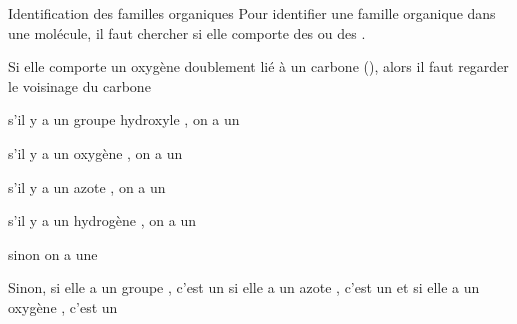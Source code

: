 \begin{doc}{Identification des familles organiques}
  Pour identifier une famille organique dans une molécule, il faut chercher si elle comporte des  ou des . 
  
  Si elle comporte un oxygène  doublement lié à un carbone (), alors il faut regarder le voisinage du carbone
  \begin{listePoints}
      \item s'il y a un groupe hydroxyle , on a un 
      \item s'il y a un oxygène , on a un 
      \item s'il y a un azote , on a un 
      \item s'il y a un hydrogène , on a un 
      \item sinon on a une 
  \end{listePoints}
  Sinon, si elle a un groupe , c'est un  si elle a un azote , c'est un  et si elle a un oxygène , c'est un 
\end{doc}